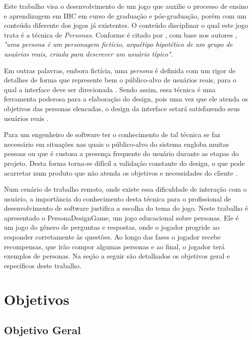 Este trabalho visa o desenvolvimento de um jogo que auxilie o processo de ensino e aprendizagem em IHC em curso de graduação e pós-graduação, porém com um conteúdo diferente dos jogos já existentes. O conteúdo disciplinar o qual este jogo trata é a técnica de \textit{Personas}. Conforme é citado por \cite[p. 176]{barbosa_silva}, com base nos autores , \textit{"uma persona é um personagem fictício, arquétipo hipotético de um grupo de usuários reais, criada para descrever um usuário típico"}. 

Em outras palavras, embora fictícia, uma \textit{persona} é definida com um rigor de detalhes de forma que represente bem o público-alvo de usuários reais, para o qual a interface deve ser direcionada  \cite[p. 177]{barbosa_silva}. Sendo assim, essa técnica é uma ferramenta poderosa para a elaboração do design, pois uma vez que ele atenda os objetivos das personas elencadas, o design da interface estará satisfazendo seus usuários reais \cite[p. 77]{cooper99}.

Para um engenheiro de software ter o conhecimento de tal técnica se faz necessário em situações nas quais o público-alvo do sistema engloba muitas pessoas ou que é custosa a presença frequente do usuário durante as etapas do projeto. Desta forma torna-se difícil a validação constante do design, o que pode acarretar num produto que não atenda os objetivos e necessidades do cliente \cite[p. 176]{barbosa_silva}.

Num cenário de trabalho remoto, onde existe essa dificuldade de interação com o usuário, a importância do conhecimento desta técnica para o profissional de desenvolvimento de software justifica a escolha do tema do jogo. Neste trabalho é apresentado o PersonaDesignGame, um jogo educacional sobre personas. Ele é um jogo do gênero de perguntas e respostas, onde o jogador progride ao responder corretamente às questões. Ao longo das fases o jogador recebe recompensas, que irão compor algumas personas e ao final, o jogador terá exemplos de personas. Na seção a seguir são detalhados os objetivos geral e específicos deste trabalho.

\section{Objetivos}

\subsection{Objetivo Geral}

